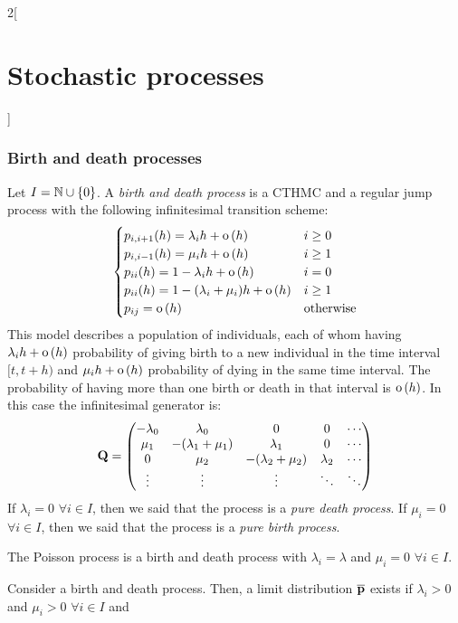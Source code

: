 \documentclass[../../../main_math.tex]{subfiles}
\begin{document}
\begin{multicols}{2}[\section{Stochastic processes}]
  \subsubsection{Birth and death processes}
  \begin{definition}
    Let $I=\mathbb{N}\cup\{0\}$. A \emph{birth and death process} is a CTHMC and a regular jump process with the following infinitesimal transition scheme:
    $$
      \begin{cases}
        p_{i,i+1}(h)=\lambda_i h+\mathrm{o}\left(h\right)       & i\geq 0          \\
        p_{i,i-1}(h)=\mu_i h+\mathrm{o}\left(h\right)           & i\geq 1          \\
        p_{ii}(h)=1-\lambda_ih+\mathrm{o}\left(h\right)         & i=0              \\
        p_{ii}(h)=1-(\lambda_i+\mu_i)h+\mathrm{o}\left(h\right) & i\geq 1          \\
        p_{ij} = \mathrm{o}\left(h\right)                       & \text{otherwise}
      \end{cases}
    $$
    This model describes a population of individuals, each of whom having $\lambda_i h + \mathrm{o}\left(h\right)$ probability of giving birth to a new individual in the time interval $[t,t+h)$ and $\mu_i h + \mathrm{o}\left(h\right)$ probability of dying in the same time interval. The probability of having more than one birth or death in that interval is $\mathrm{o}\left(h\right)$. In this case the infinitesimal generator is:
    $$
      \boldsymbol{\mathrm{Q}}=\begin{pmatrix}
        -\lambda_0 & \lambda_0          & 0                  & 0         & \cdots \\
        \mu_1      & -(\lambda_1+\mu_1) & \lambda_1          & 0         & \cdots \\
        0          & \mu_2              & -(\lambda_2+\mu_2) & \lambda_2 & \cdots \\
        \vdots     & \vdots             & \vdots             & \ddots    & \ddots
      \end{pmatrix}
    $$
    If $\lambda_i=0$ $\forall i\in I$, then we said that the process is a \emph{pure death process}. If $\mu_i=0$ $\forall i\in I$, then we said that the process is a \emph{pure birth process}.
  \end{definition}
  \begin{proposition}
    The Poisson process is a birth and death process with $\lambda_i=\lambda$ and $\mu_i=0$ $\forall i\in I$.
  \end{proposition}
  \begin{theorem}
    Consider a birth and death process. Then, a limit distribution $\boldsymbol{\mathrm{\overline{p}}}$ exists if $\lambda_i>0$ and $\mu_i>0$ $\forall i\in I$ and

\end{theorem}
\end{multicols}
\end{document}
